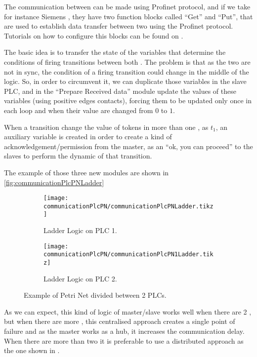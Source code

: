 The communication between \PLCs{} can be made using Profinet protocol, and if we
take for instance Siemens \PLCs, they have two function blocks called ``Get'' and
``Put'', that are used to establish data transfer between two \PLCs{} using the
Profinet protocol. Tutorials on how to configure this blocks can be found on \citep{antunesfloriano2019sincronizacao,oliveira2016protocolo,rochapereira2019automacao}.


The basic idea is to transfer the state of the variables that determine the
conditions of firing transitions between both \PLCs. The problem is that as the
two \PLCs are not in sync, the condition of a firing transition could change in
the middle of the logic. So, in order to circumvent it, we can duplicate those
variables in the slave PLC, and in the ``Prepare Received data'' module update
the values of these variables (using positive edges contacts), forcing them to
be updated only once in each loop and when their value are changed from $0$ to
$1$.

When a transition change the value of tokens in more than one \PLCs, as $t_1$,
an auxiliary variable is created in order to create a kind of
acknowledgement\slash permission 
from the master, as an ``ok, you can proceed'' to the slaves to perform the
dynamic of that transition.

The example of those three new modules are shown in \autoref{fig:communicationPlcPNLadder}

\begin{figure}[H]
  \centering
  \begin{subfigure}[t]{0.45\textwidth}
    \centering
    \texttt{[image: communicationPlcPN/communicationPlcPNLadder.tikz]}
    \caption{Ladder Logic on PLC 1.}
    \label{fig:communicationPlcPN1Ladder}
  \end{subfigure}%
  \hfill
  \begin{subfigure}[t]{0.45\textwidth}
    \centering
    \texttt{[image: communicationPlcPN/communicationPlcPN1Ladder.tikz]}
    \caption{Ladder Logic on PLC 2.}
    \label{fig:communicationPlcPN2Ladder}
  \end{subfigure}
  \caption{Example of Petri Net divided between 2 PLCs.}
  \label{fig:communicationPlcPNLadder}
\end{figure}
  
As we can expect, this kind of logic of master\slash slave works well when
there are 2 \PLCs, but when there are more \PLCs, this centralised approach
creates a single point of failure and as the master \PLC{} works as a hub, it
increases the communication delay. When there are more than two \PLCs{} it is
preferable to use a distributed approach as the one shown in
\cite{antunesfloriano2019sincronizacao}.

